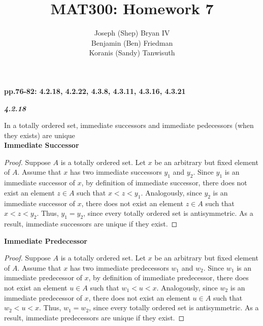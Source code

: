 \documentclass{article}
\begin{document}
\title{MAT300: Homework 7}
\author{
	Joseph (Shep) Bryan IV \\
	Benjamin (Ben) Friedman\\
	Koranis (Sandy) Tanwisuth
}

\maketitle
	\begin{flushleft}
		\textbf{pp.76-82: 4.2.18, 4.2.22, 4.3.8, 4.3.11, 4.3.16, 4.3.21}
		\\ \vspace{3mm}
		
		\textbf{\textit{4.2.18}}
		\begin{flushleft}
			In a totally ordered set, immediate successors and immediate pedecessors (when they exists) are unique 
			\\ \vspace{3mm}
			\textbf{Immediate Successor}
			\begin{proof}
				Suppose $A$ is a totally ordered set. Let $x$ be an arbitrary but fixed element of $A$. Assume that $x$ has two immediate successors $y_1$ and $y_2$. Since $y_1$ is an immediate successor of $x$, by definition of immediate successor, there does not exist an element $z \in A$ such that $x < z <y_1$. Analogously, since $y_2$ is an immediate successor of $x$, there does not exist an element $z \in A$ such that $x < z <y_2$.  Thus, $y_1 = y_2$, since every totally ordered set is antisymmetric. As a result, immediate successors are unique if they exist.
			\end{proof}
			
			\textbf{Immediate Predecessor}
			\begin{proof}
				Suppose $A$ is a totally ordered set. Let $x$ be an arbitrary but fixed element of $A$. Assume that $x$ has two immediate predecessors $w_1$ and $w_2$. Since $w_1$ is an immediate predecessor of $x$, by definition of immediate predecessor, there does not exist an element $u \in A$ such that $w_1 < u <x$. Analogously, since $w_2$ is an immediate predecessor of $x$, there does not exist an element $u \in A$ such that $w_2 < u <x$.  Thus, $w_1 = w_2$, since every totally ordered set is antisymmetric. As a result, immediate predecessors are unique if they exist.
			\end{proof}
		\end{flushleft}
		

\end{flushleft}
\end{document}
